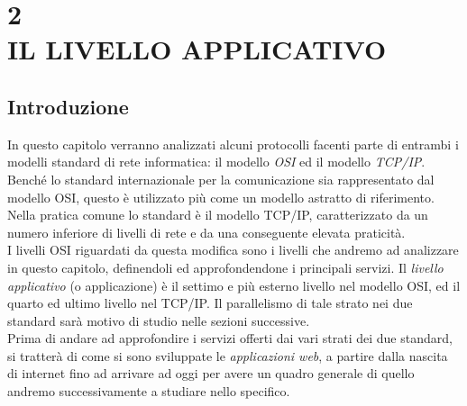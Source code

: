 \documentclass[a4paper, 11pt, oneside]{book}
\theoremstyle{plain}
\begin{document}
\chapter*{2\\IL LIVELLO APPLICATIVO} 

\section*{Introduzione}

In questo capitolo verranno analizzati alcuni protocolli facenti parte di entrambi i modelli standard di rete informatica: il modello \textit{OSI} ed il modello\textit{ TCP/IP}. \\
Benché lo standard internazionale per la comunicazione sia rappresentato dal modello OSI, questo è utilizzato più come un modello astratto di riferimento. Nella pratica comune lo standard è il modello TCP/IP, caratterizzato da un numero inferiore di livelli di rete e da una conseguente elevata praticità. \\
I livelli OSI riguardati da questa modifica sono i livelli che andremo ad analizzare in questo capitolo, definendoli ed approfondendone i principali servizi. Il \textit{livello applicativo} (o applicazione) è il settimo e più esterno livello nel modello OSI, ed il quarto ed ultimo livello nel TCP/IP. Il parallelismo di tale strato nei due standard sarà motivo di studio nelle sezioni successive.\\
Prima di andare ad approfondire i servizi offerti dai vari strati dei due standard, si tratterà di come si sono sviluppate le \textit{applicazioni web}, a partire dalla nascita di internet fino ad arrivare ad oggi per avere un quadro generale di quello andremo successivamente a studiare nello specifico.
\end{document}
